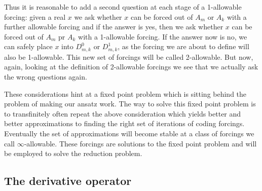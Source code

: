 \documentclass[a4paper,11pt]{article}
\begin{document}
Thus it is reasonable to add a second question at each stage of a 1-allowable forcing: given a real $x$ we ask whether $x$ can be forced out of $A_m$ or $A_k$ with a further allowable forcing and if the answer is yes, then we ask whether $x$
can be forced out of $A_m$ pr $A_k$ with a 1-allowable forcing. If the answer now is no, we can safely place $x$ into $D^0_{m,k}$ or $D^1_{m,k}$, as the forcing we are about to define will also be 1-allowable. This new set of forcings will be called 2-allowable. But now, again, looking at the definition of 2-allowable forcings we see that we actually ask the wrong questions again. 

These considerations hint at a fixed point problem which is sitting behind the problem of making our ansatz work. The way to solve this fixed point problem is to transfinitely often repeat the above consideration which yields better and better approximations to finding the right set of iterations of coding forcings. Eventually the set of approximations will become stable at a class of forcings we call $\infty$-allowable. These forcings are solutions to the fixed point problem and will be employed to solve the reduction problem.



\subsection{The derivative operator}
\end{document}
